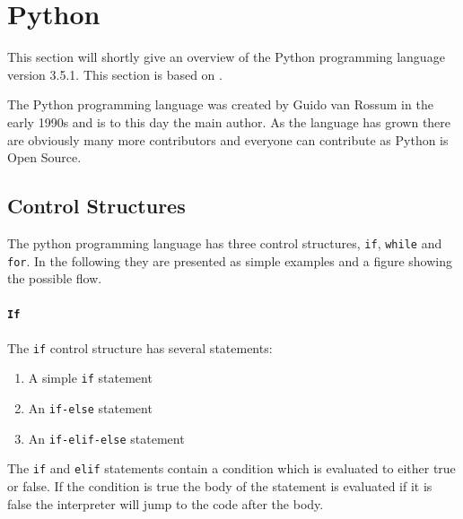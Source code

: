 \section{Python}
This section will shortly give an overview of the Python programming language version 3.5.1.
This section is based on \citet{python_docs}.

The Python programming language was created by Guido van Rossum in the early 1990s and is to this day the main author.
As the language has grown there are obviously many more contributors and everyone can contribute as Python is Open Source.

\subsection{Control Structures}
The python programming language has three control structures, \texttt{if}, \texttt{while} and \texttt{for}.
In the following they are presented as simple examples and a figure showing the possible flow.

\paragraph{\texttt{If}}
The \texttt{if} control structure has several statements:
\begin{enumerate}
\item A simple \texttt{if} statement
\item An \texttt{if-else} statement
\item An \texttt{if-elif-else} statement
\end{enumerate}
The \texttt{if} and \texttt{elif} statements contain a condition which is evaluated to either true or false.
If the condition is true the body of the statement is evaluated if it is false the interpreter will jump to the code after the body.

